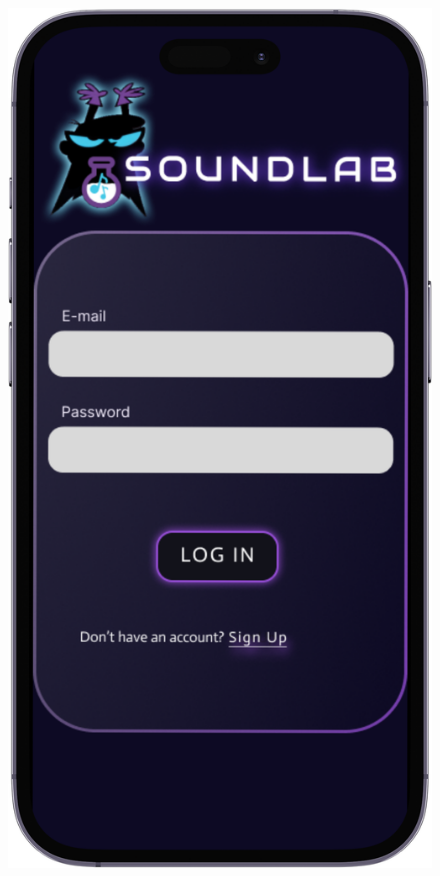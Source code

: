 \documentclass{article}
\begin{document}
\begin{figure}[htbp]
				\hfill
				\begin{minipage}{0.18\textwidth}
					\includegraphics[width=\textwidth]{Immagini/foto2}
				\end{minipage}
				\hfill
				\begin{minipage}{0.18\textwidth}

\end{minipage}
\end{figure}
\end{document}
